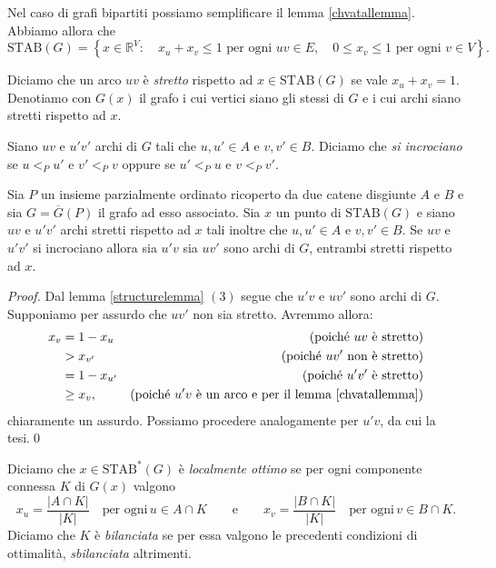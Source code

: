 Nel caso di grafi bipartiti possiamo semplificare il lemma \ref{chvatallemma}. Abbiamo allora che
\[\text{STAB}(G)=\left\{x\in \mathbb{R}^V:\quad x_u + x_v\le 1 \text{ per ogni } uv\in E,\quad 0\le x_v\le 1 \text{ per ogni } v\in V\right\}.\]
\begin{definition}
	Diciamo che un arco \(uv\) è \emph{stretto} rispetto ad \(x\in\text{STAB}(G)\) se vale \(x_u+x_v=1\). Denotiamo con \(G(x)\) il grafo i cui vertici siano gli stessi di \(G\) e i cui archi siano stretti rispetto ad \(x\). 
\end{definition}
\begin{definition}
	Siano \(uv\) e \(u'v'\) archi di \(G\) tali che \(u,u'\in A\) e \(v,v'\in B\). Diciamo che \emph{si incrociano} se \(u<_{P}u'\) e \(v'<_{P}v\) oppure se \(u'<_{P}u\) e \(v<_{P}v'\). 
\end{definition}
\begin{lemma}
	\label{crossinglemma} Sia \(P\) un insieme parzialmente ordinato ricoperto da due catene disgiunte \(A\) e \(B\) e sia \(G=\overline{G}(P)\) il grafo ad esso associato. Sia \(x\) un punto di \(\text{STAB}(G)\) e siano \(uv\) e \(u'v'\) archi stretti rispetto ad \(x\) tali inoltre che \(u,u'\in A\) e \(v,v'\in B\). Se \(uv\) e \(u'v'\) si incrociano allora sia \(u'v\) sia \(uv'\) sono archi di \(G\), entrambi stretti rispetto ad \(x\). 
\end{lemma}
\begin{proof}
	Dal lemma \ref{structurelemma} \((3)\) segue che \(u'v\) e \(uv'\) sono archi di \(G\). Supponiamo per assurdo che \(uv'\) non sia stretto. Avremmo allora: 
	\begin{align}
		x_v &= 1-x_u &\text{(poich\'e } uv \text{ \`e stretto)}\nonumber \\
		&> x_{v'} &\text{(poich\'e } uv' \text{ non \`e stretto)}\nonumber \\
		&= 1-x_{u'} &\text{(poich\'e } u'v' \text{ \`e stretto)}\nonumber \\
		&\ge x_{v}, &\text{(poich\'e } u'v \text{ \`e un arco e per il lemma \ref{chvatallemma})}\nonumber 
	\end{align}
	chiaramente un assurdo. Possiamo procedere analogamente per \(u'v\), da cui la tesi.\qed 
\end{proof}
\begin{definition}
	Diciamo che \(x\in\text{STAB}^{*}(G)\) è \emph{localmente ottimo} se per ogni componente connessa \(K\) di \(G(x)\) valgono
	\[x_u=\frac{|A\cap K|}{|K|}\quad\text{per ogni}\,u\in A\cap K\qquad\text{e}\qquad x_v=\frac{|B\cap K|}{|K|}\quad\text{per ogni}\,v\in B\cap K.\]
	Diciamo che \(K\) è \emph{bilanciata} se per essa valgono le precedenti condizioni di ottimalità, \emph{sbilanciata} altrimenti. 
\end{definition}
